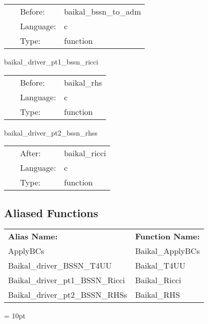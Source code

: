 \hspace{5mm}

 \begin{tabular*}{160mm}{cll} 
~ & Before:  & baikal\_bssn\_to\_adm \\ 
~ & Language:  & c \\ 
~ & Type:  & function \\ 
\end{tabular*} 


\vspace{5mm}


\hspace{5mm} baikal\_driver\_pt1\_bssn\_ricci 

\hspace{5mm}{\it mol: compute ricci tensor } 


\hspace{5mm}

 \begin{tabular*}{160mm}{cll} 
~ & Before:  & baikal\_rhs \\ 
~ & Language:  & c \\ 
~ & Type:  & function \\ 
\end{tabular*} 


\vspace{5mm}


\hspace{5mm} baikal\_driver\_pt2\_bssn\_rhss 

\hspace{5mm}{\it mol: evaluate bssn rhss } 


\hspace{5mm}

 \begin{tabular*}{160mm}{cll} 
~ & After:  & baikal\_ricci \\ 
~ & Language:  & c \\ 
~ & Type:  & function \\ 
\end{tabular*} 


\subsection*{Aliased Functions}

\hspace{5mm}

 \begin{tabular*}{160mm}{ll} 

{\bf Alias Name:} ~~~~~~~ & {\bf Function Name:} \\ 
ApplyBCs & Baikal\_ApplyBCs \\ 
Baikal\_driver\_BSSN\_T4UU & Baikal\_T4UU \\ 
Baikal\_driver\_pt1\_BSSN\_Ricci & Baikal\_Ricci \\ 
Baikal\_driver\_pt2\_BSSN\_RHSs & Baikal\_RHS \\ 
\end{tabular*} 



\vspace{5mm}\parskip = 10pt 
